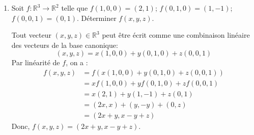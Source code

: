\documentclass[french]{yLectureNote}
\renewcommand{\vec}{\overrightarrow}
\renewcommand{\vec}{\overrightarrow}
\begin{document}
\begin{enumerate}
\begin{itemize}
        \item $f_{3}:\mathbb{R}^{2}\rightarrow\mathbb{R}^{2}$, $(x,y)\mapsto x(0,y)$ \\
        \textbf{Non linéaire.} Prenons $\lambda=2$ et $\vec{u}=(1,1)$.
        \begin{itemize}
            \item $f_{3}(\lambda\vec{u}) = f_{3}(2(1,1)) = f_{3}(2,2) = 2(0,2) = (0,4)$.
            \item $\lambda f_{3}(\vec{u}) = 2 f_{3}(1,1) = 2(1(0,1)) = 2(0,1) = (0,2)$.
        \end{itemize}
        Comme $f_{3}(\lambda\vec{u}) \neq \lambda f_{3}(\vec{u})$, l'application n'est pas linéaire.
    \end{itemize}

    \item Soit $f:\mathbb{R}^{3}\rightarrow\mathbb{R}^{2}$ telle que $f(1,0,0)=(2,1)$; $f(0,1,0)=(1,-1)$; $f(0,0,1)=(0,1)$. Déterminer $f(x,y,z)$.

    Tout vecteur $(x,y,z) \in \mathbb{R}^3$ peut être écrit comme une combinaison linéaire des vecteurs de la base canonique:
    $$(x,y,z) = x(1,0,0) + y(0,1,0) + z(0,0,1)$$
    Par linéarité de $f$, on a :
    \begin{align*}
    f(x,y,z) &= f(x(1,0,0) + y(0,1,0) + z(0,0,1)) \\
    &= xf(1,0,0) + yf(0,1,0) + zf(0,0,1) \\
    &= x(2,1) + y(1,-1) + z(0,1) \\
    &= (2x,x) + (y,-y) + (0,z) \\
    &= (2x+y, x-y+z)
    \end{align*}
    Donc, $f(x,y,z)=(2x+y, x-y+z)$.
\end{enumerate}
\end{document}
